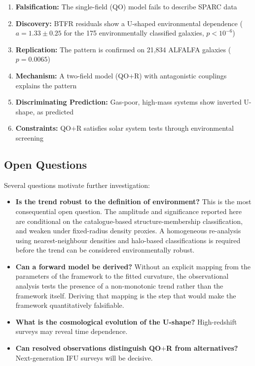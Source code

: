 \documentclass[12pt,a4paper]{article}
\newcommand{\QOR}{QO$+$R}
\begin{document}
\begin{enumerate}
    \item \textbf{Falsification:} The single-field (QO) model fails to describe SPARC data
    \item \textbf{Discovery:} BTFR residuals show a U-shaped environmental dependence ($a = 1.33 \pm 0.25$ for the 175 environmentally classified galaxies, $p < 10^{-6}$)
    \item \textbf{Replication:} The pattern is confirmed on 21,834 ALFALFA galaxies ($p = 0.0065$)
    \item \textbf{Mechanism:} A two-field model (\QOR{}) with antagonistic couplings explains the pattern
    \item \textbf{Discriminating Prediction:} Gas-poor, high-mass systems show inverted U-shape, as predicted
    \item \textbf{Constraints:} \QOR{} satisfies solar system tests through environmental screening
\end{enumerate}

\subsection{Open Questions}

Several questions motivate further investigation:

\begin{itemize}
    \item \textbf{Is the trend robust to the definition of environment?} This is the most consequential open question. The amplitude and significance reported here are conditional on the catalogue-based structure-membership classification, and weaken under fixed-radius density proxies. A homogeneous re-analysis using nearest-neighbour densities and halo-based classifications is required before the trend can be considered environmentally robust.
    \item \textbf{Can a forward model be derived?} Without an explicit mapping from the parameters of the framework to the fitted curvature, the observational analysis tests the presence of a non-monotonic trend rather than the framework itself. Deriving that mapping is the step that would make the framework quantitatively falsifiable.
    \item \textbf{What is the cosmological evolution of the U-shape?} High-redshift surveys may reveal time dependence.
    \item \textbf{Can resolved observations distinguish \QOR{} from alternatives?} Next-generation IFU surveys will be decisive.
\end{itemize}
\end{document}
